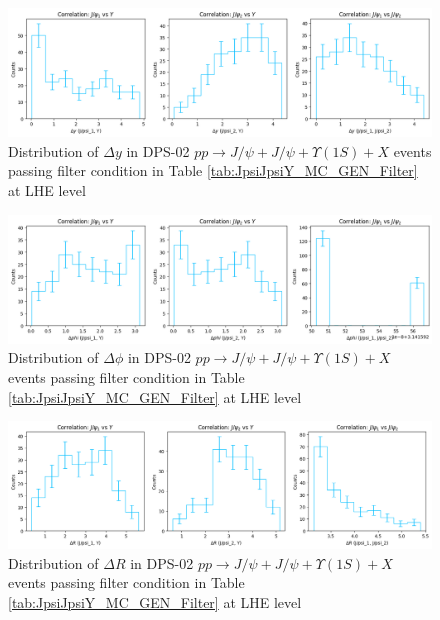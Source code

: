 \documentclass[10pt,twocolumn]{article}
\begin{document}
\begin{figure}[!htbp]
    \centering
    \includegraphics[width=1.0\linewidth]{images/LHE_LEVEL_DPS_JJ_Y1S_DeltaY_filtered.png}
    \caption{Distribution of $\Delta y$ in DPS-02 $pp\to J/\psi+J/\psi+\Upsilon(1S)+X$ events passing filter condition in Table \ref{tab:JpsiJpsiY_MC_GEN_Filter} at LHE level}
    \label{fig:DPS02_JJY1S_filtered_DeltaY_LHE}
\end{figure}

\begin{figure}[!htbp]
    \centering
    \includegraphics[width=1.0\linewidth]{images/LHE_LEVEL_DPS_JJ_Y1S_DeltaPhi_filtered.png}
    \caption{Distribution of $\Delta \phi$ in DPS-02 $pp\to J/\psi+J/\psi+\Upsilon(1S)+X$ events passing filter condition in Table \ref{tab:JpsiJpsiY_MC_GEN_Filter} at LHE level}
    \label{fig:DPS02_JJY1S_filtered_DeltaPhi_LHE}
\end{figure}

\begin{figure}[!htbp]
    \centering
    \includegraphics[width=1.0\linewidth]{images/LHE_LEVEL_DPS_JJ_Y1S_DeltaR_filtered.png}
    \caption{Distribution of $\Delta R$ in DPS-02 $pp\to J/\psi+J/\psi+\Upsilon(1S)+X$ events passing filter condition in Table \ref{tab:JpsiJpsiY_MC_GEN_Filter} at LHE level}
    \label{fig:DPS02_JJY1S_filtered_DeltaR_LHE}
\end{figure}
\end{document}
